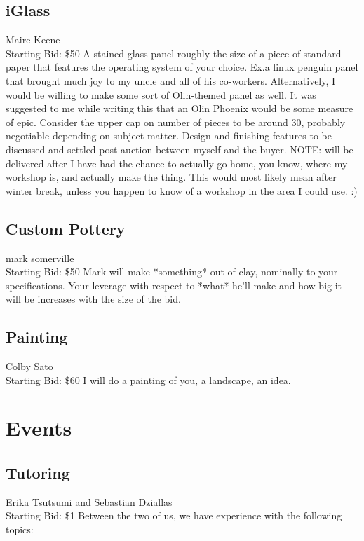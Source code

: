 \documentclass[11pt]{article}
\begin{document}
\subsection{iGlass}
Maire Keene
\\
Starting Bid: \$50
\newline
A stained glass panel roughly the size of a piece of standard paper that features the operating system of your choice. Ex.a linux penguin panel that brought much joy to my uncle and all of his co-workers. 
Alternatively, I would be willing to make some sort of Olin-themed panel as well. It was suggested to me while writing this that an Olin Phoenix would be some measure of epic.
Consider the upper cap on number of pieces to be around 30, probably negotiable depending on subject matter. 
Design and finishing features to be discussed and settled post-auction between myself and the buyer.
NOTE: will be delivered after I have had the chance to actually go home, you know, where my workshop is, and actually make the thing. This would most likely mean after winter break, unless you happen to know of a workshop in the area I could use.  :)
\subsection{Custom Pottery}
mark somerville
\\
Starting Bid: \$50
\newline
Mark will make *something* out of clay, nominally to your specifications.  Your leverage with respect to *what* he'll make and how big it will be increases with the size of the bid.
\subsection{Painting}
Colby Sato
\\
Starting Bid: \$60
\newline
I will do a painting of you, a landscape, an idea.
\section{Events}
\subsection{Tutoring}
Erika Tsutsumi and Sebastian Dziallas
\\
Starting Bid: \$1
\newline
Between the two of us, we have experience with the following topics:
\end{document}
